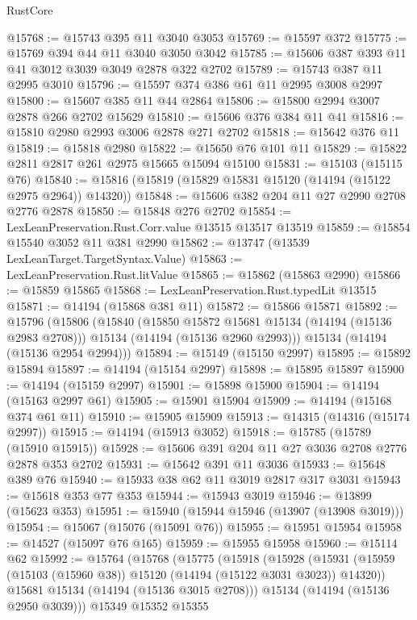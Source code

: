 \begin{lexlean}{RustCore}
\begin{coremodule}
@15768 := @15743 @395 @11 @3040 @3053
@15769 := @15597 @372
@15775 := @15769 @394 @44 @11 @3040 @3050 @3042
@15785 := @15606 @387 @393 @11 @41 @3012 @3039 @3049 @2878 @322 @2702
@15789 := @15743 @387 @11 @2995 @3010
@15796 := @15597 @374 @386 @61 @11 @2995 @3008 @2997
@15800 := @15607 @385 @11 @44 @2864
@15806 := @15800 @2994 @3007 @2878 @266 @2702 @15629
@15810 := @15606 @376 @384 @11 @41
@15816 := @15810 @2980 @2993 @3006 @2878 @271 @2702
@15818 := @15642 @376 @11
@15819 := @15818 @2980
@15822 := @15650 @76 @101 @11
@15829 := @15822 @2811 @2817 @261 @2975 @15665 @15094 @15100
@15831 := @15103 (@15115 @76)
@15840 := @15816 (@15819 (@15829 @15831 @15120 (@14194 (@15122 @2975 @2964)) @14320))
@15848 := @15606 @382 @204 @11 @27 @2990 @2708 @2776 @2878
@15850 := @15848 @276 @2702
@15854 := LexLeanPreservation.Rust.Corr.value @13515 @13517 @13519
@15859 := @15854 @15540 @3052 @11 @381 @2990
@15862 := @13747 (@13539 LexLeanTarget.TargetSyntax.Value)
@15863 := LexLeanPreservation.Rust.litValue
@15865 := @15862 (@15863 @2990)
@15866 := @15859 @15865
@15868 := LexLeanPreservation.Rust.typedLit @13515
@15871 := @14194 (@15868 @381 @11)
@15872 := @15866 @15871
@15892 := @15796
    (@15806
      (@15840
        (@15850 @15872 @15681 @15134 (@14194 (@15136 @2983 @2708)))
        @15134
        (@14194 (@15136 @2960 @2993)))
      @15134
      (@14194 (@15136 @2954 @2994)))
@15894 := @15149 (@15150 @2997)
@15895 := @15892 @15894
@15897 := @14194 (@15154 @2997)
@15898 := @15895 @15897
@15900 := @14194 (@15159 @2997)
@15901 := @15898 @15900
@15904 := @14194 (@15163 @2997 @61)
@15905 := @15901 @15904
@15909 := @14194 (@15168 @374 @61 @11)
@15910 := @15905 @15909
@15913 := @14315 (@14316 (@15174 @2997))
@15915 := @14194 (@15913 @3052)
@15918 := @15785 (@15789 (@15910 @15915))
@15928 := @15606 @391 @204 @11 @27 @3036 @2708 @2776 @2878 @353 @2702
@15931 := @15642 @391 @11 @3036
@15933 := @15648 @389 @76
@15940 := @15933 @38 @62 @11 @3019 @2817 @317 @3031
@15943 := @15618 @353 @77 @353
@15944 := @15943 @3019
@15946 := @13899 (@15623 @353)
@15951 := @15940 (@15944 @15946 (@13907 (@13908 @3019)))
@15954 := @15067 (@15076 (@15091 @76))
@15955 := @15951 @15954
@15958 := @14527 (@15097 @76 @165)
@15959 := @15955 @15958
@15960 := @15114 @62
@15992 := @15764
    (@15768
      (@15775
        (@15918
          (@15928
            (@15931 (@15959 (@15103 (@15960 @38)) @15120 (@14194 (@15122 @3031 @3023)) @14320))
            @15681
            @15134
            (@14194 (@15136 @3015 @2708)))
          @15134
          (@14194 (@15136 @2950 @3039)))
        @15349
        @15352
        @15355

\end{coremodule}
\end{lexlean}
